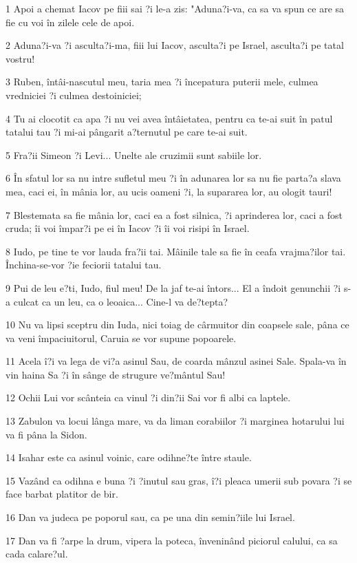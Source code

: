 \par 1 Apoi a chemat Iacov pe fiii sai ?i le-a zis: "Aduna?i-va, ca sa va spun ce are sa fie cu voi în zilele cele de apoi.
\par 2 Aduna?i-va ?i asculta?i-ma, fiii lui Iacov, asculta?i pe Israel, asculta?i pe tatal vostru!
\par 3 Ruben, întâi-nascutul meu, taria mea ?i începatura puterii mele, culmea vredniciei ?i culmea destoiniciei;
\par 4 Tu ai clocotit ca apa ?i nu vei avea întâietatea, pentru ca te-ai suit în patul tatalui tau ?i mi-ai pângarit a?ternutul pe care te-ai suit.
\par 5 Fra?ii Simeon ?i Levi... Unelte ale cruzimii sunt sabiile lor.
\par 6 În sfatul lor sa nu intre sufletul meu ?i în adunarea lor sa nu fie parta?a slava mea, caci ei, în mânia lor, au ucis oameni ?i, la supararea lor, au ologit tauri!
\par 7 Blestemata sa fie mânia lor, caci ea a fost silnica, ?i aprinderea lor, caci a fost cruda; îi voi împar?i pe ei în Iacov ?i îi voi risipi în Israel.
\par 8 Iudo, pe tine te vor lauda fra?ii tai. Mâinile tale sa fie în ceafa vrajma?ilor tai. Închina-se-vor ?ie feciorii tatalui tau.
\par 9 Pui de leu e?ti, Iudo, fiul meu! De la jaf te-ai întors... El a îndoit genunchii ?i s-a culcat ca un leu, ca o leoaica... Cine-l va de?tepta?
\par 10 Nu va lipsi sceptru din Iuda, nici toiag de cârmuitor din coapsele sale, pâna ce va veni împaciuitorul, Caruia se vor supune popoarele.
\par 11 Acela î?i va lega de vi?a asinul Sau, de coarda mânzul asinei Sale. Spala-va în vin haina Sa ?i în sânge de strugure ve?mântul Sau!
\par 12 Ochii Lui vor scânteia ca vinul ?i din?ii Sai vor fi albi ca laptele.
\par 13 Zabulon va locui lânga mare, va da liman corabiilor ?i marginea hotarului lui va fi pâna la Sidon.
\par 14 Isahar este ca asinul voinic, care odihne?te între staule.
\par 15 Vazând ca odihna e buna ?i ?inutul sau gras, î?i pleaca umerii sub povara ?i se face barbat platitor de bir.
\par 16 Dan va judeca pe poporul sau, ca pe una din semin?iile lui Israel.
\par 17 Dan va fi ?arpe la drum, vipera la poteca, înveninând piciorul calului, ca sa cada calare?ul.
